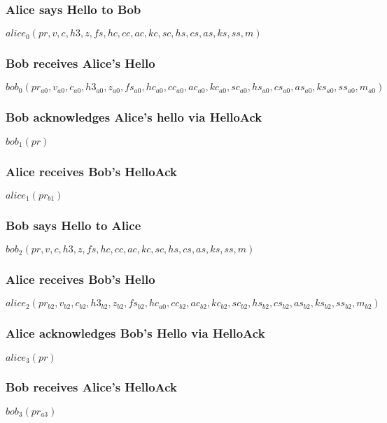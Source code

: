 \documentclass[11pt]{article}
\begin{document}
  \subsubsection{Alice says Hello to Bob}
   $alice_0(pr,v,c,h3,z,fs,hc,cc,ac,kc,sc,hs,cs,as,ks,ss,m)$
  \subsubsection{Bob receives Alice's Hello}
   $bob_0(pr_{a0},v_{a0},c_{a0},h3_{a0},z_{a0},fs_{a0},hc_{a0}
     ,cc_{a0},ac_{a0},kc_{a0},sc_{a0},hs_{a0},cs_{a0}
          ,as_{a0},ks_{a0},ss_{a0},m_{a0})$
  \subsubsection{Bob acknowledges Alice's hello via HelloAck}
  $bob_1(pr)$
  \subsubsection{Alice receives Bob's HelloAck}
  $alice_1(pr_{b1})$
  \subsubsection{Bob says Hello to Alice}
  $bob_2(pr,v,c,h3,z,fs,hc,cc,ac,kc,sc,hs,cs,as,ks,ss,m)$
  \subsubsection{Alice receives Bob's Hello}
   $alice_2(pr_{b2},v_{b2},c_{b2},h3_{b2},z_{b2},fs_{b2},hc_{a0}
     ,cc_{b2},ac_{b2},kc_{b2},sc_{b2},hs_{b2},cs_{b2}
          ,as_{b2},ks_{b2},ss_{b2},m_{b2})$
  \subsubsection{Alice acknowledges Bob's Hello via HelloAck}
  $alice_3(pr)$
  \subsubsection{Bob receives Alice's HelloAck}
  $bob_3(pr_{a3})$
\end{document}

